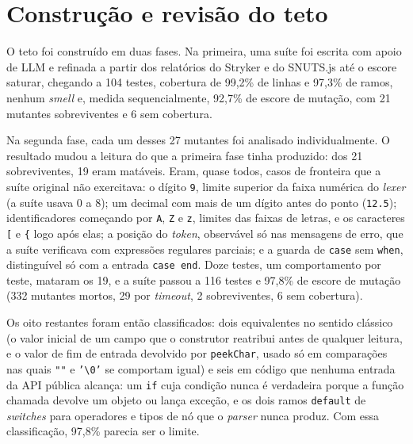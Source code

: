 \section{Construção e revisão do teto}
\label{sec:teto}

O teto foi construído em duas fases. Na primeira, uma suíte foi escrita com apoio de LLM e refinada a partir dos relatórios do Stryker e do SNUTS.js até o escore saturar, chegando a 104 testes, cobertura de 99,2\% de linhas e 97,3\% de ramos, nenhum \textit{smell} e, medida sequencialmente, 92,7\% de escore de mutação, com 21 mutantes sobreviventes e 6 sem cobertura.

Na segunda fase, cada um desses 27 mutantes foi analisado individualmente. O resultado mudou a leitura do que a primeira fase tinha produzido: dos 21 sobreviventes, 19 eram matáveis. Eram, quase todos, casos de fronteira que a suíte original não exercitava: o dígito \texttt{9}, limite superior da faixa numérica do \textit{lexer} (a suíte usava 0 a 8); um decimal com mais de um dígito antes do ponto (\texttt{12.5}); identificadores começando por \texttt{A}, \texttt{Z} e \texttt{z}, limites das faixas de letras, e os caracteres \texttt{[} e \texttt{\{} logo após elas; a posição do \textit{token}, observável só nas mensagens de erro, que a suíte verificava com expressões regulares parciais; e a guarda de \texttt{case} sem \texttt{when}, distinguível só com a entrada \texttt{case end}. Doze testes, um comportamento por teste, mataram os 19, e a suíte passou a 116 testes e 97,8\% de escore de mutação (332 mutantes mortos, 29 por \textit{timeout}, 2 sobreviventes, 6 sem cobertura).

Os oito restantes foram então classificados: dois equivalentes no sentido clássico (o valor inicial de um campo que o construtor reatribui antes de qualquer leitura, e o valor de fim de entrada devolvido por \texttt{peekChar}, usado só em comparações nas quais \texttt{""} e \texttt{'\textbackslash 0'} se comportam igual) e seis em código que nenhuma entrada da API pública alcança: um \texttt{if} cuja condição nunca é verdadeira porque a função chamada devolve um objeto ou lança exceção, e os dois ramos \texttt{default} de \textit{switches} para operadores e tipos de nó que o \textit{parser} nunca produz. Com essa classificação, 97,8\% parecia ser o limite.


